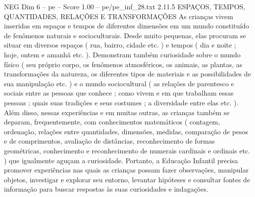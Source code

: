 \begin{textsample}{NEG Dim 6 – pe – Score 1.00 – pe/pe\_inf\_28.txt}  \label{ex:f6_neg_040}
2.11.5 ESPAÇOS, TEMPOS, QUANTIDADES, RELAÇÕES E TRANSFORMAÇÕES As crianças vivem inseridas em espaços e tempos de diferentes dimensões em um mundo constituído de fenômenos naturais e socioculturais.
Desde muito pequenas, elas procuram se situar em diversos espaços ( rua, bairro, cidade etc. ) e tempos ( dia e noite ; hoje, ontem e amanhã etc. ).
Demonstram também curiosidade sobre o mundo físico ( seu próprio corpo, os fenômenos atmosféricos, os animais, as plantas, as transformações da natureza, os diferentes tipos de materiais e as possibilidades de sua manipulação etc. ) e o mundo sociocultural ( as relações de parentesco e sociais entre as pessoas que conhece ; como vivem e em que trabalham essas pessoas ; quais suas tradições e seus costumes ; a diversidade entre elas etc. ).
Além disso, nessas experiências e em muitas outras, as crianças também se deparam, frequentemente, com conhecimentos matemáticos ( contagem, ordenação, relações entre quantidades, dimensões, medidas, comparação de pesos e de comprimentos, avaliação de distâncias, reconhecimento de formas geométricas, conhecimento e reconhecimento de numerais cardinais e ordinais etc. ) que igualmente aguçam a curiosidade.
Portanto, a Educação Infantil precisa promover experiências nas quais as crianças possam fazer observações, manipular objetos, investigar e explorar seu entorno, levantar hipóteses e consultar fontes de informação para buscar respostas às suas curiosidades e indagações.

\end{textsample}
